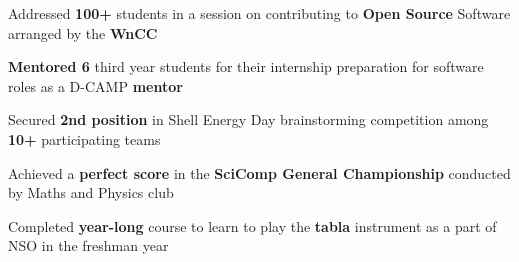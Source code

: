 \documentclass[11pt]{article}
\newcommand{\smallbullet}{
    \small$\bullet$
}
\newenvironment{bullet-list-major}{
    \vspace*{8pt}
    \begin{list}{
        \smallbullet
    }{
        \setlength\leftmargin{15pt}\topsep -5pt \itemsep -6pt
    }
} {
    \end{list}
}
\begin{document}
    \begin{bullet-list-major}
        \item Addressed \textbf{100+} students in a session on contributing to \textbf{Open Source} Software arranged by the \textbf{WnCC}
        \item \textbf{Mentored 6} third year students for their internship preparation for software roles as a D-CAMP \textbf{mentor}
        \item Secured \textbf{2nd position} in Shell Energy Day brainstorming competition among \textbf{10+} participating teams
        \item Achieved a \textbf{perfect score} in the \textbf{SciComp General Championship} conducted by Maths and Physics club
        \item Completed \textbf{year-long} course to learn to play the \textbf{tabla} instrument as a part of NSO in the freshman year
    \end{bullet-list-major}


    \vspace*{-7.71mm}
\end{document}
